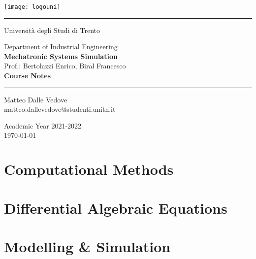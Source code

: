 \documentclass[10pt,letterpaper,oneside,openright]{book}
\begin{document}
	
	\frontmatter
	
	\begin{center}
		\vspace{3cm}
		\thispagestyle{empty}
		\texttt{[image: logouni]}
		
		\vspace{1cm}
		\rule{5cm}{0.5pt}
		\vspace{1cm}		
		
		{\Large Università degli Studi di Trento}
		
		\vspace{2cm}
		{\Large Department of Industrial Engineering} \\ \vspace{2mm}
		{\LARGE \textbf{Mechatronic Systems Simulation}} \\ \vspace{2mm}
		{\Large Prof.: Bertolazzi Enrico, Biral Francesco}\\
		
		\vspace{2cm}
		{\LARGE \textbf{Course Notes}}
		
		\vspace{1cm}
		\rule{5cm}{0.5pt}
		\vspace{1cm}	
		
		{\large 
			Matteo Dalle Vedove \\
			\makeatletter
			matteo.dallevedove@studenti.unitn.it
			
			\vspace{2cm}
			Academic Year 2021-2022 \\ \today}
	\end{center}
	
	\tableofcontents
	\mainmatter
	
	\part{Computational Methods}
	
	
		
	
	
	
	\part{Differential Algebraic Equations} \label{part:DAE}
	
	
	
	
	
	\part{Modelling \& Simulation}
	
	
	
	
	
	\appendix
	
	
\end{document}

